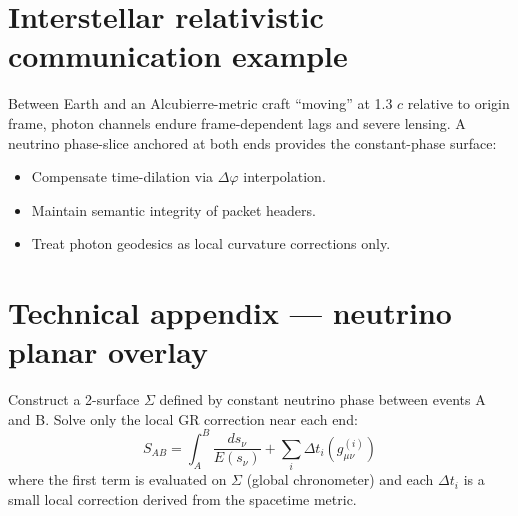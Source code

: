 \documentclass[12pt]{article}
\begin{document}
\section{Interstellar relativistic communication example}
Between Earth and an Alcubierre-metric craft “moving” at 1.3 $c$ relative to origin frame, photon channels endure frame-dependent lags and severe lensing. A neutrino phase-slice anchored at both ends provides the constant-phase surface:
\begin{itemize}
\item Compensate time-dilation via $\Delta \varphi$ interpolation.
\item Maintain semantic integrity of packet headers.
\item Treat photon geodesics as local curvature corrections only.
\end{itemize}

\section{Technical appendix — neutrino planar overlay}
Construct a 2-surface $\Sigma$ defined by constant neutrino phase between events A and B. Solve only the local GR correction near each end:
\[
S_{AB} = \int_A^B \frac{ds_\nu}{E(s_\nu)} + \sum_i \Delta t_i(g_{\mu\nu}^{(i)})
\]
where the first term is evaluated on $\Sigma$ (global chronometer) and each $\Delta t_i$ is a small local correction derived from the spacetime metric.
\end{document}
